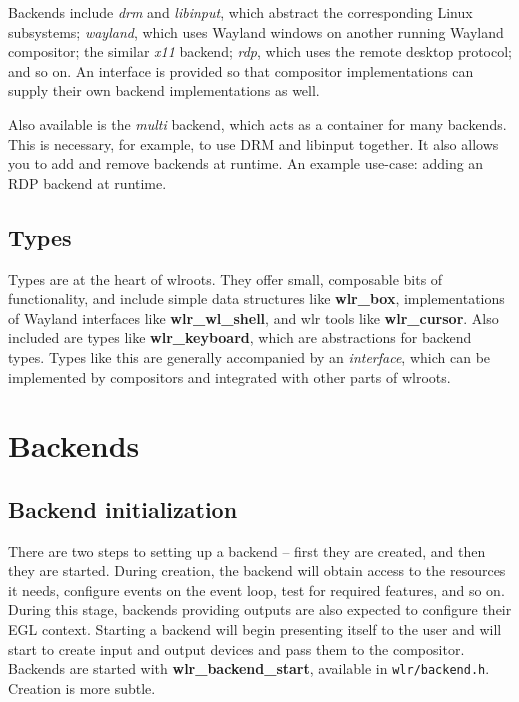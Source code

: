 \documentclass{article}
\newcommand{\code}[1]{\texttt{#1}}
\begin{document}
Backends include \emph{drm} and \emph{libinput}, which abstract the
corresponding Linux subsystems; \emph{wayland}, which uses Wayland windows on
another running Wayland compositor; the similar \emph{x11} backend; \emph{rdp},
which uses the remote desktop protocol; and so on. An interface is provided so
that compositor implementations can supply their own backend implementations as
well.

Also available is the \emph{multi} backend, which acts as a container for many
backends. This is necessary, for example, to use DRM and libinput together. It
also allows you to add and remove backends at runtime. An example use-case:
adding an RDP backend at runtime.

\subsection{Types}\label{high level types}

Types are at the heart of wlroots. They offer small, composable bits of
functionality, and include simple data structures like \textbf{wlr_box},
implementations of Wayland interfaces like \textbf{wlr_wl_shell}, and wlr tools
like \textbf{wlr_cursor}. Also included are types like \textbf{wlr_keyboard},
which are abstractions for backend types. Types like this are generally
accompanied by an \emph{interface}, which can be implemented by compositors and
integrated with other parts of wlroots.

\newpage
\section{Backends}\label{backends}

\subsection{Backend initialization}\label{backend init}

There are two steps to setting up a backend -- first they are created, and then
they are started. During creation, the backend will obtain access to the
resources it needs, configure events on the event loop, test for required
features, and so on. During this stage, backends providing outputs are also
expected to configure their EGL context. Starting a backend will begin
presenting itself to the user and will start to create input and output devices
and pass them to the compositor. Backends are started with
\textbf{wlr_backend_start}, available in \code{wlr/backend.h}. Creation is more
subtle.
\end{document}
